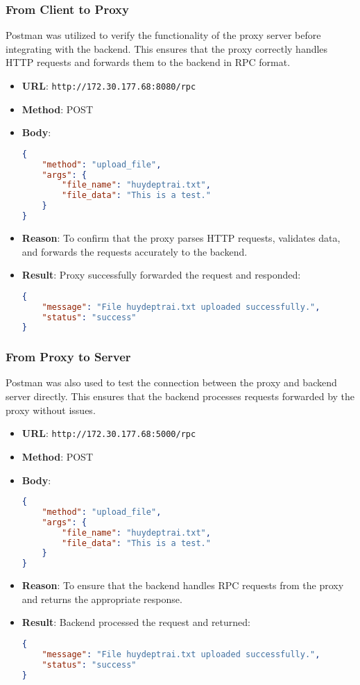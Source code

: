 \documentclass{article}
\begin{document}
\subsubsection*{From Client to Proxy}
Postman was utilized to verify the functionality of the proxy server before integrating with the backend. This ensures that the proxy correctly handles HTTP requests and forwards them to the backend in RPC format.
\begin{itemize}
\item \textbf{URL}: \texttt{http://172.30.177.68:8080/rpc}
\item \textbf{Method}: POST
\item \textbf{Body}:
\begin{lstlisting}[language=JSON]
{
    "method": "upload_file",
    "args": {
        "file_name": "huydeptrai.txt",
        "file_data": "This is a test."
    }
}
\end{lstlisting}
\item \textbf{Reason}: To confirm that the proxy parses HTTP requests, validates data, and forwards the requests accurately to the backend.
\item \textbf{Result}: Proxy successfully forwarded the request and responded:
\begin{lstlisting}[language=JSON]
{
    "message": "File huydeptrai.txt uploaded successfully.",
    "status": "success"
}
\end{lstlisting}
\end{itemize}

\subsubsection*{From Proxy to Server}
Postman was also used to test the connection between the proxy and backend server directly. This ensures that the backend processes requests forwarded by the proxy without issues.
\begin{itemize}
\item \textbf{URL}: \texttt{http://172.30.177.68:5000/rpc}
\item \textbf{Method}: POST
\item \textbf{Body}:
\begin{lstlisting}[language=JSON]
{
    "method": "upload_file",
    "args": {
        "file_name": "huydeptrai.txt",
        "file_data": "This is a test."
    }
}
\end{lstlisting}
\item \textbf{Reason}: To ensure that the backend handles RPC requests from the proxy and returns the appropriate response.
\item \textbf{Result}: Backend processed the request and returned:
\begin{lstlisting}[language=JSON]
{
    "message": "File huydeptrai.txt uploaded successfully.",
    "status": "success"
}
\end{lstlisting}
\end{itemize}
\end{document}

